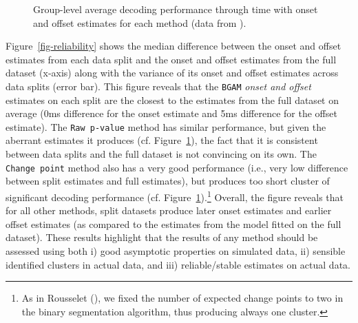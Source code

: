 \documentclass[
  doc,
  floatsintext,
  longtable,
  a4paper,
  nolmodern,
  notxfonts,
  notimes,
  colorlinks=true,linkcolor=blue,citecolor=blue,urlcolor=blue]{apa7}
\begin{document}
\begin{figure}[!htb]

\caption{\label{fig-onset-offset}Group-level average decoding
performance through time with onset and offset estimates for each method
(data from ).}


\end{figure}%

Figure~\ref{fig-reliability} shows the median difference between the
onset and offset estimates from each data split and the onset and offset
estimates from the full dataset (x-axis) along with the variance of its
onset and offset estimates across data splits (error bar). This figure
reveals that the \texttt{BGAM} \emph{onset and offset} estimates on each
split are the closest to the estimates from the full dataset on average
(0ms difference for the onset estimate and 5ms difference for the offset
estimate). The \texttt{Raw\ p-value} method has similar performance, but
given the aberrant estimates it produces (cf.
Figure~\ref{fig-onset-offset}), the fact that it is consistent between
data splits and the full dataset is not convincing on its own. The
\texttt{Change\ point} method also has a very good performance (i.e.,
very low difference between split estimates and full estimates), but
produces too short cluster of significant decoding performance (cf.
Figure~\ref{fig-onset-offset}).\footnote{As in Rousselet
  (), we fixed the number of
  expected change points to two in the binary segmentation algorithm,
  thus producing always one cluster.} Overall, the figure reveals that
for all other methods, split datasets produce later onset estimates and
earlier offset estimates (as compared to the estimates from the model
fitted on the full dataset). These results highlight that the results of
any method should be assessed using both i) good asymptotic properties
on simulated data, ii) sensible identified clusters in actual data, and
iii) reliable/stable estimates on actual data.
\end{document}
